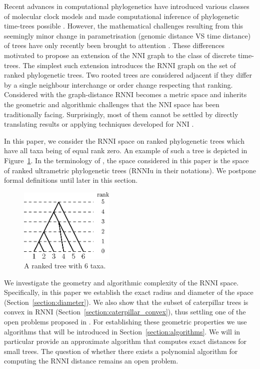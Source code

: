 \documentclass{amsart}
\newcommand{\nni}{\mathrm{NNI}}
\newcommand{\rnni}{\mathrm{RNNI}}
\newcommand{\rnniu}{\mathrm{RNNIu}}
\begin{document}
Recent advances in computational phylogenetics have introduced various classes of molecular clock models \autocite{Yoder2000-ks,Drummond2006-nl,Drummond2010-yf} and made computational inference of phylogenetic time-trees possible \autocite{Ronquist2003-eq, Bouckaert2018-yr, Hadfield2018-xp}.
However, the mathematical challenges resulting from this seemingly minor change in parametrisation (genomic distance VS time distance) of trees have only recently been brought to attention \autocite{Gavryushkin2016-uu}.
These differences motivated \textcite{Gavryushkin2018-ol} to propose an extension of the $\nni$ graph to the class of discrete time-trees.
The simplest such extension introduces the $\rnni$ graph on the set of ranked phylogenetic trees.
Two rooted trees are considered adjacent if they differ by a single neighbour interchange or order change respecting that ranking. 
Considered with the graph-distance $\rnni$ becomes a metric space and inherits the geometric and algorithmic challenges that the $\nni$ space has been traditionally facing.
Surprisingly, most of them cannot be settled by directly translating results or applying techniques developed for $\nni$ \autocite{Gavryushkin2018-ol}.

In this paper, we consider the $\rnni$ space on ranked phylogenetic trees which have all taxa being of equal rank zero.
An example of such a tree is depicted in Figure~\ref{fig:ranked_tree}.
In the terminology of \autocite{Gavryushkin2018-ol}, the space considered in this paper is the space of ranked ultrametric phylogenetic trees ($\rnniu$ in their notations).
We postpone formal definitions until later in this section.

\begin{figure}[H]
\centering
\includegraphics[width=0.4\textwidth]{ranked_tree}
\vspace{12pt}
\caption{A ranked tree with $6$ taxa.}
\label{fig:ranked_tree}
\end{figure}

We investigate the geometry and algorithmic complexity of the $\rnni$ space.
Specifically, in this paper we establish the exact radius and diameter of the space (Section~\ref{section:diameter}).
We also show that the subset of caterpillar trees is convex in $\rnni$ (Section~\ref{section:caterpillar_convex}), thus settling one of the open problems proposed in \autocite{Gavryushkin2018-ol}.
For establishing these geometric properties we use algorithms that will be introduced in Section~\ref{section:algorithms}.
We will in particular provide an approximate algorithm that computes exact distances for small trees.
The question of whether there exists a polynomial algorithm for computing the $\rnni$ distance remains an open problem.
\end{document}
